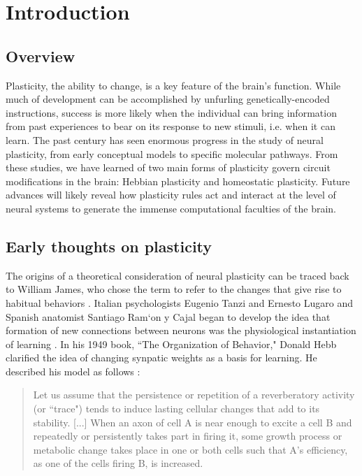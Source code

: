 \chapter{Introduction}

\section{Overview}

Plasticity, the ability to change, is a key feature of the brain's function. While much of development can be accomplished by  unfurling genetically-encoded instructions, success is more likely when the individual can bring information from past experiences to bear on its response to new stimuli, i.e. when it can learn. The past century has seen enormous progress in the study of neural plasticity, from early conceptual models to specific molecular pathways. From these studies, we have learned of two main forms of plasticity govern circuit modifications in the brain: Hebbian plasticity and homeostatic plasticity. Future advances will likely reveal how plasticity rules act and interact at the level of neural systems to generate the immense computational faculties of the brain.

\section{Early thoughts on plasticity}
The origins of a theoretical consideration of neural plasticity can be traced back to William James, who chose the term to refer to the changes that give rise to habitual behaviors \cite{James1910, Berlucchi2009}. Italian psychologists Eugenio Tanzi and Ernesto Lugaro and Spanish anatomist Santiago Ram\a`on y Cajal began to develop the idea that formation of new connections between neurons was the physiological instantiation of learning \cite{Berlucchi2009}. In his 1949 book, ``The Organization of Behavior," Donald Hebb clarified the idea of changing synpatic weights as a basis for learning. He described his model as follows \cite{Hebb1949}:

\begin{quotation}
Let us assume that the persistence or repetition of a reverberatory activity (or ``trace") tends to induce lasting cellular changes that add to its stability. [...] When an axon of cell A is near enough to excite a cell B and repeatedly or persistently takes part in firing it, some growth process or metabolic change takes place in one or both cells such that A's efficiency, as one of the cells firing B, is increased.
\end{quotation}

